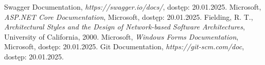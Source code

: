 \documentclass[polish,12pt,twoside,a4paper]{report}
\begin{document}




\newpage

\newpage

\newpage

\newpage

\newpage

\newpage


\begin{thebibliography}{6}

 Swagger Documentation, \textit{https://swagger.io/docs/}, dostęp: 20.01.2025.
 Microsoft, \textit{ASP.NET Core Documentation}, Microsoft, dostęp: 20.01.2025.
 Fielding, R. T., \textit{Architectural Styles and the Design of Network-based Software Architectures}, University of California, 2000.
 Microsoft, \textit{Windows Forms Documentation}, Microsoft, dostęp: 20.01.2025.
 Git Documentation, \textit{https://git-scm.com/doc}, dostęp: 20.01.2025.

\end{thebibliography}
\newpage


\end{document}
